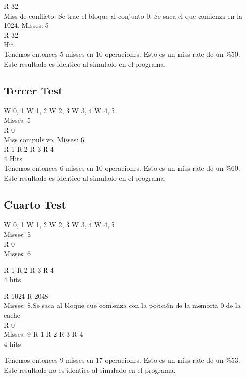 \documentclass[11pt,a4paper, spanish]{article}
\begin{document}
R 32\\
Miss de conflicto. Se trae el bloque al conjunto 0. Se saca el que comienza en la 1024.
Misses: 5\\

R 32\\
Hit\\

Tenemos entonces 5 misses en 10 operaciones. Esto es un miss rate de un \%50. Este resultado es identico al simulado en el programa.\\

\subsection{Tercer Test}

W 0, 1
W 1, 2
W 2, 3
W 3, 4
W 4, 5\\
Misses: 5\\

R 0\\
Miss compulsivo. Misses: 6\\

R 1
R 2
R 3
R 4\\
4 Hits\\

Tenemos entonces 6 misses en 10 operaciones. Esto es un miss rate de un \%60. Este resultado es identico al simulado en el programa.\\

\subsection{Cuarto Test}
W 0, 1
W 1, 2
W 2, 3
W 3, 4
W 4, 5\\
Misses: 5\\
R 0 \\
Misses: 6

R 1
R 2
R 3
R 4\\
4 hits

R 1024
R 2048\\ 
Misses: 8.Se saca al bloque que comienza con la posición de la memoria 0 de la cache\\ 

R 0
\\ Misses: 9
R 1
R 2
R 3
R 4
\\ 4 hits

Tenemos entonces 9 misses en 17 operaciones. Esto es un miss rate de un \%53. Este resultado no es identico al simulado en el programa.\\
\end{document}
